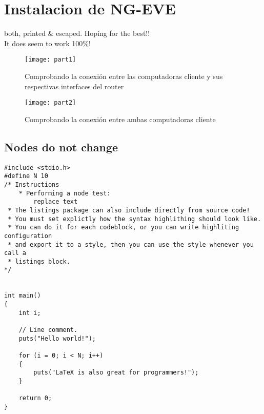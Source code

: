 \documentclass{article} %
\author{\nombre , \carnet}
\title{\titulo}
\begin{document}
\maketitle

\section{Instalacion de NG-EVE}
	both, printed & escaped. Hoping for the best!!\\It does seem to work 100\%!
	\blindtext
	\begin{figure}[h]
		\texttt{[image: part1]}
		 \caption{Comprobando la conexión entre las computadoras cliente y sus respectivas interfaces del router}
	    \label{fig:conn1}
	\end{figure}
	\begin{figure}[h]
		\texttt{[image: part2]}
		\caption{Comprobando la conexión entre ambas computadoras cliente}
	\end{figure}
	\FloatBarrier %
		\subsection{Nodes do not change}
			\blindtext
			\begin{lstlisting}
#include <stdio.h>
#define N 10
/* Instructions 
	* Performing a node test: 
		replace text
 * The listings package can also include directly from source code!
 * You must set explictly how the syntax highlithing should look like.
 * You can do it for each codeblock, or you can write highliting configuration 
 * and export it to a style, then you can use the style whenever you call a 
 * listings block.
*/


int main()
{
    int i;

    // Line comment.
    puts("Hello world!");

    for (i = 0; i < N; i++)
    {
        puts("LaTeX is also great for programmers!");
    }

    return 0;
}
		\end{lstlisting} 
\end{document}
